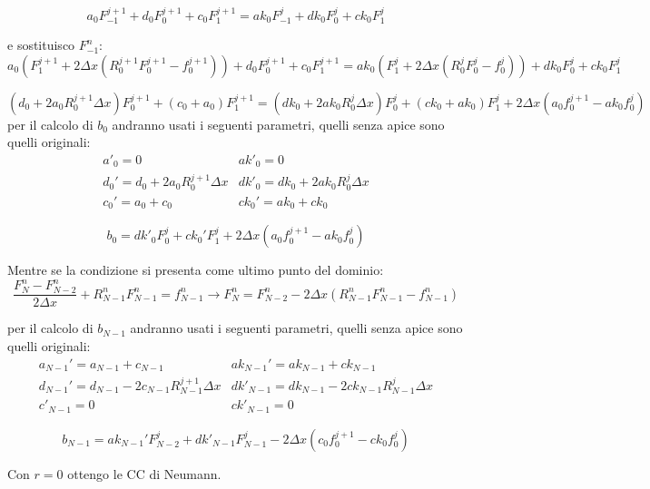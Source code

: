 \documentclass[]{article}
\newcommand{\lr}[3]{\ensuremath{\left#1 #3 \right#2}}
\newcommand{\lrt}[1]{\lr{(}{)}{#1}}
\numberwithin{equation}{subsection}
\begin{document}
$$
a_0  F_{-1}^{j+1} + d_0 F_{0}^{j+1} + c_{0}F_{1}^{j+1} = 
ak_0 F_{-1}^{j}   + dk_0 F_{0}^{j}  + ck_0 F_{1}^{j}
$$

e sostituisco $F_{-1}^{n}$:
$$
a_0 \lrt{ F_{1}^{j+1} + 2 \Delta x \lrt{R_0^{j+1}F_{0}^{j+1}-f^{j+1}_0}} +d_0 F_{0}^{j+1} +c_{0}F_{1}^{j+1} = 
ak_0 \lrt{F_{1}^{j} + 2 \Delta x \lrt{R_0^jF_{0}^{j}-f^{j}_0}} + dk_0 F_{0}^{j} + ck_0 F_{1}^{j}
$$

$$
\lrt{d_0 + 2 a_0 R_0^{j+1}\Delta x} F_0^{j+1} + \lrt{c_0+a_0}F^{j+1}_1 = 
\lrt{dk_0 + 2 ak_0 R_0^{j}\Delta x} F_0^{j} + \lrt{ck_0+ak_0}F^{j}_1 + 
2 \Delta x \lrt{a_0 f^{j+1}_0-ak_0 f^j_0}
$$
per il calcolo di $b_0$ andranno usati i seguenti parametri, quelli senza apice sono quelli originali:
$$
\begin{array}{ll}
a'_0 = 0 & ak'_0= 0\\
d_0' = d_0 + 2 a_0 R_0^{j+1}\Delta x& dk'_0 = dk_0 + 2 ak_0 R_0^{j}\Delta x\\
c_0' = a_0+c_0 & ck_0' = ak_0+ck_0
\end{array}
$$

$$b_0 = dk'_0 F_0^j  + ck_0' F_1^j + 2 \Delta x \lrt{a_0 f^{j+1}_0-ak_0 f^j_0}$$

Mentre se la condizione si presenta come ultimo punto del dominio:
$$\frac{F_{N}^{n}-F_{N-2}^{n}}{2\Delta x} + R_{N-1}^nF_{N-1}^{n} = f_{N-1}^n  \to 
F_{N}^{n} = F_{N-2}^{n} - 2\Delta x \lrt{R_{N-1}^nF_{N-1}^{n}-f^n_{N-1}}$$

per il calcolo di $b_{N-1}$ andranno usati i seguenti parametri, quelli senza apice sono quelli originali:
$$
\begin{array}{ll}
a_{N-1}' = a_{N-1}+c_{N-1} & ak_{N-1}' = ak_{N-1}+ck_{N-1}\\
d_{N-1}' = d_{N-1} - 2 c_{N-1} R_{N-1}^{j+1}\Delta x& dk'_{N-1} = dk_{N-1} - 2 ck_{N-1} R_{N-1}^{j}\Delta x\\
c'_{N-1} = 0 & ck'_{N-1}= 0
\end{array}
$$

$$b_{N-1} = ak_{N-1}' F_{N-2}^j + dk'_{N-1} F_{N-1}^j - 2 \Delta x \lrt{c_0 f^{j+1}_0-ck_0 f^j_0}$$

Con $r=0$ ottengo le CC di Neumann.
\end{document}
